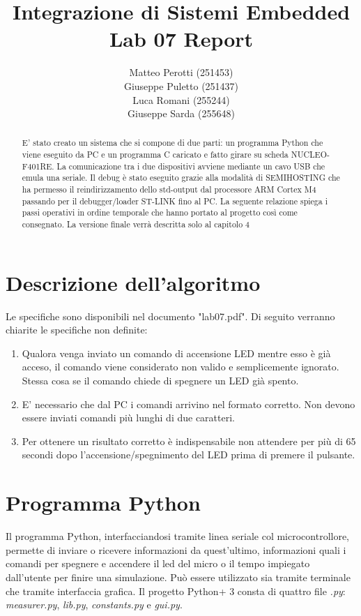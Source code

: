 \documentclass[a4paper]{article}
\title{Integrazione di Sistemi Embedded\\Lab 07 Report}
\author{Matteo Perotti (251453)\\Giuseppe Puletto (251437)\\Luca Romani (255244)\\Giuseppe Sarda (255648)}
\begin{document}
\maketitle

\newpage

\begin{abstract}
	E' stato creato un sistema che si compone di due parti: un programma Python che viene eseguito da PC e un programma C caricato e fatto girare su scheda NUCLEO-F401RE. La comunicazione tra i due dispositivi avviene mediante un cavo USB che emula una seriale. 
	Il debug è stato eseguito grazie alla modalità di SEMIHOSTING che ha permesso il reindirizzamento dello std-output dal processore ARM Cortex M4 passando per il debugger/loader ST-LINK fino al PC.\newline
	La seguente relazione spiega i passi operativi in ordine temporale che hanno portato al progetto così come consegnato. La versione finale verrà descritta solo al capitolo 4
\end{abstract}

\section{Descrizione dell'algoritmo}
Le specifiche sono disponibili nel documento "lab07.pdf". Di seguito verranno chiarite le specifiche non definite:
\begin{enumerate}
	\item Qualora venga inviato un comando di accensione LED mentre esso è già acceso, il comando viene considerato non valido e semplicemente ignorato. Stessa cosa se il comando chiede di spegnere un LED già spento.
	\item E' necessario che dal PC i comandi arrivino nel formato corretto. Non devono essere inviati comandi più lunghi di due caratteri.
	\item Per ottenere un risultato corretto è indispensabile non attendere per più di 65 secondi dopo l'accensione/spegnimento del LED prima di premere il pulsante.
\end{enumerate}

\section{Programma Python}
Il programma Python, interfacciandosi tramite linea seriale col microcontrollore, permette di inviare o ricevere informazioni da quest'ultimo, informazioni quali i comandi per spegnere e accendere il led del micro o il tempo impiegato dall'utente per finire una simulazione. Pu\`{o} essere utilizzato sia tramite terminale che tramite interfaccia grafica. Il progetto Python+
3 consta di quattro file \textit{.py}: \textit{measurer.py}, \textit{lib.py}, \textit{constants.py} e \textit{gui.py}.
\end{document}
